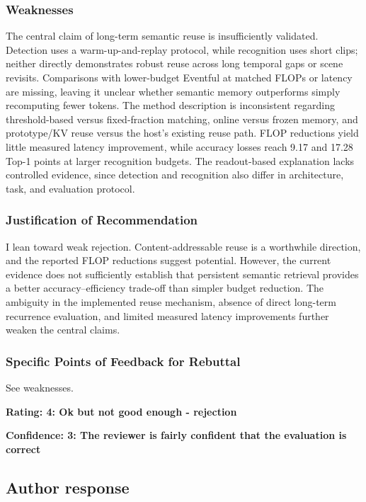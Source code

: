 \documentclass[11pt]{article}
\begin{document}
\subsubsection*{Weaknesses}
The central claim of long-term semantic reuse is insufficiently validated. Detection uses a warm-up-and-replay protocol, while recognition uses short clips; neither directly demonstrates robust reuse across long temporal gaps or scene revisits.
Comparisons with lower-budget Eventful at matched FLOPs or latency are missing, leaving it unclear whether semantic memory outperforms simply recomputing fewer tokens.
The method description is inconsistent regarding threshold-based versus fixed-fraction matching, online versus frozen memory, and prototype/KV reuse versus the host's existing reuse path.
FLOP reductions yield little measured latency improvement, while accuracy losses reach 9.17 and 17.28 Top-1 points at larger recognition budgets.
The readout-based explanation lacks controlled evidence, since detection and recognition also differ in architecture, task, and evaluation protocol.
\subsubsection*{Justification of Recommendation}
I lean toward weak rejection. Content-addressable reuse is a worthwhile direction, and the reported FLOP reductions suggest potential. However, the current evidence does not sufficiently establish that persistent semantic retrieval provides a better accuracy--efficiency trade-off than simpler budget reduction. The ambiguity in the implemented reuse mechanism, absence of direct long-term recurrence evaluation, and limited measured latency improvements further weaken the central claims.

\subsubsection*{Specific Points of Feedback for Rebuttal}
See weaknesses.

\noindent\textbf{Rating: 4: Ok but not good enough - rejection}\par
\noindent\textbf{Confidence: 3: The reviewer is fairly confident that the evaluation is correct}\par

\subsection{Author response}
\end{document}
